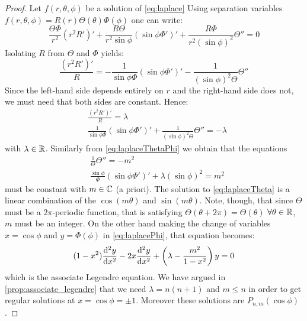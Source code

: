 \documentclass[../main.tex]{subfiles}
\begin{document}
\begin{proof}
  Let $f(r,\theta,\phi)$ be a solution of \cref{eq:laplace} Using separation variables $f(r,\theta,\phi)=R(r)\Theta(\theta)\Phi(\phi)$ one can write:
  \begin{equation}
    \frac{\Theta\Phi}{r^2}{(r^2R')}'+\frac{R\Theta}{r^2\sin\phi}{(\sin\phi\Phi')}'+\frac{R\Phi}{r^2{(\sin\phi)}^2}\Theta''=0
  \end{equation}
  Isolating $R$ from $\Theta$ and $\Phi$ yields:
  \begin{equation}
    \frac{{(r^2R')}'}{R}=-\frac{1}{\sin\phi\Phi}{(\sin\phi\Phi')}'-\frac{1}{{(\sin\phi)}^2\Theta}\Theta''
  \end{equation}
  Since the left-hand side depends entirely on $r$ and the right-hand side does not, we must need that both sides are constant. Hence:
  \begin{align}
    \label{eq:laplaceR}        & \frac{{(r^2R')}'}{R}=\lambda                                                               \\
    \label{eq:laplaceThetaPhi} & \frac{1}{\sin\phi\Phi}{(\sin\phi\Phi')}'+\frac{1}{{(\sin\phi)}^2\Theta}\Theta''  =-\lambda
  \end{align}
  with $\lambda\in\mathbb{R}$. Similarly from \cref{eq:laplaceThetaPhi} we obtain that the equations
  \begin{align}
    \label{eq:laplaceTheta} & \frac{1}{\Theta}\Theta''  =-m^2                                     \\
    \label{eq:laplacePhi}   & \frac{\sin\phi}{\Phi}{(\sin\phi\Phi')}'+\lambda{(\sin\phi)}^2  =m^2
  \end{align}
  must be constant with $m\in\mathbb{C}$ (a priori). The solution to \cref{eq:laplaceTheta} is a linear combination of the $\cos(m\theta)$ and $\sin(m\theta)$. Note, though, that since $\Theta$ must be a $2\pi$-periodic function, that is satisfying $\Theta(\theta+2\pi)=\Theta(\theta)$ $\forall\theta\in\mathbb{R}$, $m$ must be an integer. On the other hand making the change of variables $x=\cos \phi$ and $y=\Phi(\phi)$ in \cref{eq:laplacePhi}, that equation becomes:
  \begin{equation}\label{}
    (1-x^2)\dv[2]{y}{x}-2x\dv[2]{y}{x}+\left(\lambda-\frac{m^2}{1-x^2}\right)y=0
  \end{equation}
  which is the associate Legendre equation. We have argued in \cref{prop:associate_legendre} that we need $\lambda=n(n+1)$ and $m\leq n$ in order to get regular solutions at $x=\cos\phi=\pm 1$. Moreover these solutions are $P_{n,m}(\cos\phi)$.


\end{proof}
\end{document}
